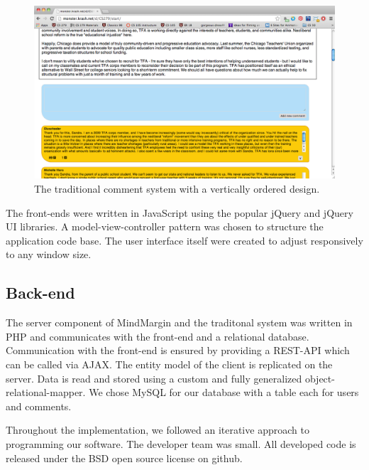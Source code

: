 \begin{figure}
\centering
\includegraphics[scale=0.18]{traditional.png} 
\caption{The traditional comment system with a vertically ordered design.}
\label{fig:traditional}
\end{figure}

The front-ends were written in JavaScript using the popular jQuery and jQuery UI libraries. A model-view-controller pattern was chosen to structure the application code base. The user interface itself were created to adjust responsively to any window size.

\subsection{Back-end}
The server component of MindMargin and the traditonal system was written in PHP and communicates with the front-end and a relational database. Communication with the front-end is ensured by providing a REST-API which can be called via AJAX. The entity model of the client is replicated on the server. Data is read and stored using a custom and fully generalized object-relational-mapper. We chose MySQL for our database with a table each for users and comments.

Throughout the implementation, we followed an iterative approach to programming our software. The developer team was small. All developed code is released under the BSD open source license on github.